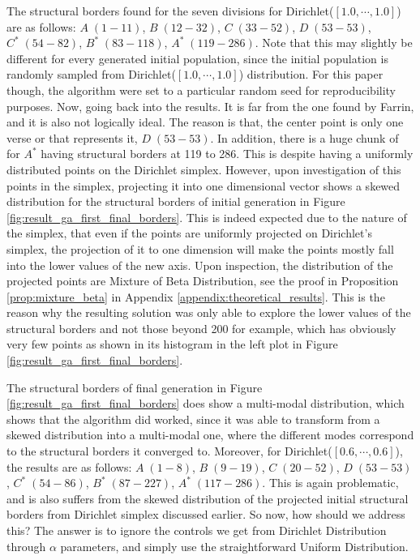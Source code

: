 The structural borders found for the seven divisions for Dirichlet($[1.0,\cdots,1.0]$) are as follows: $A\;(1-11)$, $B\;(12-32)$, $C\;(33-52)$, $D\;(53-53)$, $C^*\;(54-82)$, $B^*\;(83-118)$, $A^*\;(119-286)$. Note that this may slightly be different for every generated initial population, since the initial population is randomly sampled from Dirichlet($[1.0,\cdots,1.0]$) distribution. For this paper though, the algorithm were set to a particular random seed for reproducibility purposes. Now, going back into the results. It is far from the one found by Farrin, and it is also not logically ideal. The reason is that, the center point is only one verse or   that represents it, $D\;(53-53)$. In addition, there is a huge chunk of   for $A^*$ having structural borders at 119 to 286. This is despite having a uniformly distributed points on the Dirichlet simplex. However, upon investigation of this points in the simplex, projecting it into one dimensional vector shows a skewed distribution for the structural borders of initial generation in Figure \ref{fig:result_ga_first_final_borders}. This is indeed expected due to the nature of the simplex, that even if the points are uniformly projected on Dirichlet's simplex, the projection of it to one dimension will make the points mostly fall into the lower values of the new axis. Upon inspection, the distribution of the projected points are Mixture of Beta Distribution, see the proof in Proposition \ref{prop:mixture_beta} in Appendix \ref{appendix:theoretical_results}. This is the reason why the resulting solution was only able to explore the lower values of the structural borders and not those beyond 200 for example, which has obviously very few points as shown in its histogram in the left plot in Figure \ref{fig:result_ga_first_final_borders}.

The structural borders of final generation in Figure \ref{fig:result_ga_first_final_borders} does show a multi-modal distribution, which shows that the algorithm did worked, since it was able to transform from a skewed distribution into a multi-modal one, where the different modes correspond to the structural borders it converged to. Moreover, for Dirichlet($[0.6,\cdots,0.6]$), the results are as follows: $A\;(1-8)$, $B\;(9-19)$, $C\;(20-52)$, $D\;(53-53)$, $C^*\;(54-86)$, $B^*\;(87-227)$, $A^*\;(117-286)$. This is again problematic, and is also suffers from the skewed distribution of the projected initial structural borders from Dirichlet simplex discussed earlier. So now, how should we address this? The answer is to ignore the controls we get from Dirichlet Distribution through $\alpha$ parameters, and simply use the straightforward Uniform Distribution.

